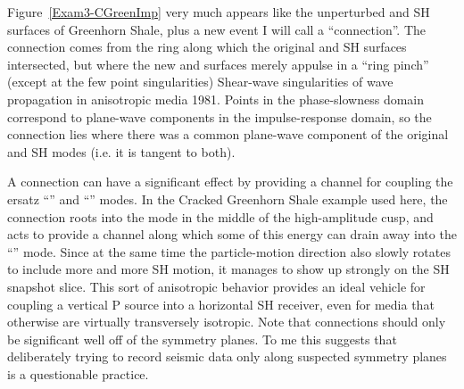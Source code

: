 %
%

Figure~\ref{Exam3-CGreenImp} very much appears like the unperturbed
{\qSV} and {SH} surfaces of Greenhorn Shale, plus a new event I
will call a ``connection''.
The connection comes from the ring along which the original {\qSV} and SH
surfaces intersected, but where the new {} and {} surfaces
merely appulse in a ``ring pinch'' (except at the few point singularities)
{Shear-wave singularities of wave propagation in anisotropic media}
{1981}.
Points in the phase-slowness domain correspond to plane-wave components
in the impulse-response domain, so the connection lies where there
was a common plane-wave component of the original {\qSV} and SH modes
(i.e. it is tangent to both).

A connection can have a significant effect by providing a channel
for coupling the ersatz ``{\qSV}'' and ``{\qSH}'' modes.
In the Cracked Greenhorn Shale example used here, the connection roots
into the {\qSV} mode in the middle of the high-amplitude cusp,
and acts to provide a channel along which some of this energy can
drain away into the ``{\qSH}'' mode.
Since at the same time the particle-motion direction also slowly rotates
to include more and more SH motion, it manages to show up strongly
on the SH snapshot slice.
This sort of anisotropic behavior provides an ideal vehicle for
coupling a vertical P source into a horizontal SH receiver, even
for media that otherwise are virtually transversely isotropic.
Note that connections should only be significant well off of the
symmetry planes. To me this suggests that deliberately trying
to record seismic data
only along suspected symmetry planes is a questionable practice.


